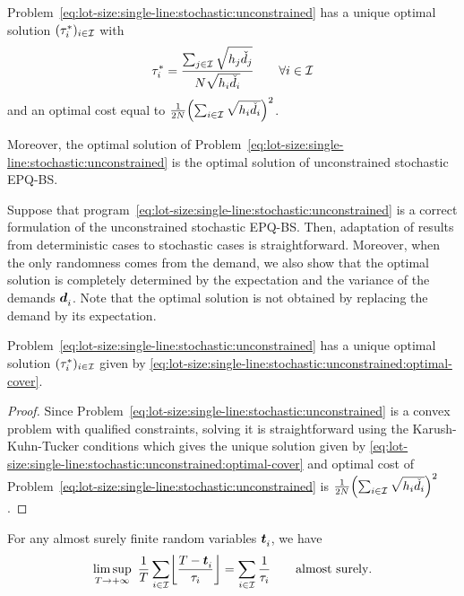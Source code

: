 \begin{thm}\label{thm:lot-size:single-line:stochastic:unconstrained:optimality}
Problem~\eqref{eq:lot-size:single-line:stochastic:unconstrained} has a unique optimal solution $(\tau_i^*)_{i\in\mathcal{I}}$ with
\begin{equation}\label{eq:lot-size:single-line:stochastic:unconstrained:optimal-cover}
  \tau_i^*= \frac{\sum_{j\in\mathcal{I}}\sqrt{h_j\check{d}_j}}{N\sqrt{h_i\check{d}_i}}\qquad\forall i\in\mathcal{I}
\end{equation}
and an optimal cost equal to $\frac{1}{2\nbsetups}\bracket{\sum_{i\in\REF}\sqrt{\holding_i\check{\demand}_i}}^2$.

Moreover, the optimal solution of Problem~\eqref{eq:lot-size:single-line:stochastic:unconstrained} is the optimal solution of unconstrained stochastic EPQ-BS.
\end{thm}


Suppose that program~\eqref{eq:lot-size:single-line:stochastic:unconstrained} is a correct formulation of the unconstrained stochastic EPQ-BS. Then, adaptation of results from deterministic cases to stochastic cases is straightforward.
Moreover, when the only randomness comes from the demand, we also show that the optimal solution is completely determined by the expectation and the variance of the demands $\va\demand_i$.
Note that the optimal solution is not obtained by replacing the demand by its expectation.


\begin{lem}\label{lem:lot-size:single-line:stochastic:unconstrained:optimality}
Problem~\eqref{eq:lot-size:single-line:stochastic:unconstrained} has a unique optimal solution $(\tau_i^*)_{i\in\mathcal{I}}$ given by \cref{eq:lot-size:single-line:stochastic:unconstrained:optimal-cover}.
\end{lem}


\begin{proof}
Since Problem~\eqref{eq:lot-size:single-line:stochastic:unconstrained} is a convex problem with qualified constraints, solving it is straightforward using the Karush-Kuhn-Tucker conditions which gives the unique solution given by \cref{eq:lot-size:single-line:stochastic:unconstrained:optimal-cover} and optimal cost of Problem~\eqref{eq:lot-size:single-line:stochastic:unconstrained} is $\frac{1}{2\nbsetups}\bracket{\sum_{i\in\REF}\sqrt{\holding_i\check{\demand}_i}}^2$.
\end{proof}


\begin{lem}\label{lem:lot-size:stochastic:single-line:models:average-setup}
For any almost surely finite random variables $\va t_i$, we have
\begin{equation}
\limsup_{\horizon\rightarrow+\infty}\ \frac{1}{\horizon} \sum_{i\in\REF} \left\lfloor\frac{\horizon-\va t_i}{\cover_i}\right\rfloor
=
\sum_{i\in\REF} \frac{1}{\cover_i}\qquad \mbox{almost surely}.
\end{equation}
\end{lem}


